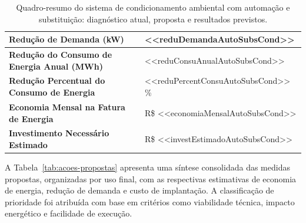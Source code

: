 \begin{table}[H]
{\begin{tabular}{|>{\raggedright\arraybackslash}p{11cm}|>{\centering\arraybackslash}p{5cm}|}
\hline
\textbf{Redução de Demanda (kW)} & <<reduDemandaAutoSubsCond>>
 \\
\hline
\textbf{Redução do Consumo de Energia Anual (MWh)} & <<reduConsuAnualAutoSubsCond>>
 \\
\hline
\textbf{Redução Percentual do Consumo de Energia} & <<reduPercentConsuAutoSubsCond>>
 \% \\
\hline
\textbf{Economia Mensal na Fatura de Energia} & R\$ <<economiaMensalAutoSubsCond>>
 \\
\hline
\textbf{Investimento Necessário Estimado} & R\$ <<investEstimadoAutoSubsCond>>
 \\
\hline
\end{tabular}%
}
\caption{Quadro-resumo do sistema de condicionamento ambiental com automação e substituição: diagnóstico atual, proposta e resultados previstos.}
\label{tab:resumo-condicionamento-automacao-subs}
\end{table}

A Tabela~\ref{tab:acoes-propostas} apresenta uma síntese consolidada das medidas propostas, organizadas por uso final, com as respectivas estimativas de economia de energia, redução de demanda e custo de implantação. A classificação de prioridade foi atribuída com base em critérios como viabilidade técnica, impacto energético e facilidade de execução.


